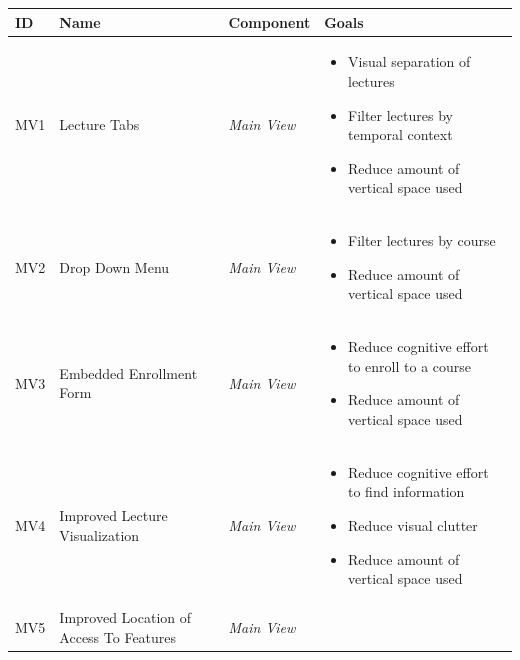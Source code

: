 \cleardoublepage
\renewcommand*{\arraystretch}{1.5}
\begin{longtable}{ | p{0.7cm} | p{2.8cm} | p{2cm} | p{7.6cm} |}
	\hline
	ID & Name & Component & Goals \\ \hline
	MV1 & Lecture Tabs & \emph{Main View}& 
	\vspace{-0.45cm}
	\begin{itemize}[leftmargin=*,noitemsep, topsep=0pt,  partopsep=0pt]
		\item Visual separation of lectures
		\item Filter lectures by temporal context
		\item Reduce amount of vertical space used
	\end{itemize} \vspace{-0.45cm} \\ \hline
	MV2 & Drop Down Menu & \emph{Main View} & 
	\vspace{-0.45cm}
	\begin{itemize}[leftmargin=*,noitemsep, topsep=0pt]
		\item Filter lectures by course
		\item Reduce amount of vertical space used
	\end{itemize} \vspace{-0.45cm} \\ \hline
	MV3 & Embedded Enrollment Form &\emph{Main View} &
	\vspace{-0.45cm}
	\begin{itemize}[leftmargin=*,noitemsep, topsep=0pt]
		\item Reduce cognitive effort to enroll to a course
		\item Reduce amount of vertical space used
	\end{itemize} \vspace{-0.45cm} \\ \hline
	MV4 & Improved Lecture Visualization &\emph{Main View} &
	\vspace{-0.45cm}	
	\begin{itemize}[leftmargin=*,noitemsep, topsep=0pt]
		\item Reduce cognitive effort to find information
		\item Reduce visual clutter
		\item Reduce amount of vertical space used
	\end{itemize} \vspace{-0.45cm} \\ \hline
	MV5 & Improved Location of Access To Features &\emph{Main View} &

\end{longtable}
